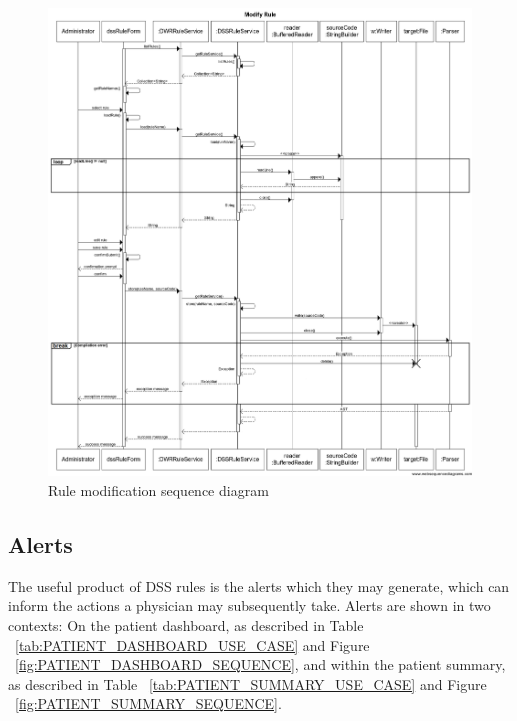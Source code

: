 \documentclass[12pt,letterpaper]{article}
\begin{document}
\begin{figure}\begin{center}
\includegraphics[width=6.5in]{sequence/modify_rule.png}
\end{center}
\caption{Rule modification sequence diagram} 
\label{fig:MODIFY_RULE_SEQUENCE}
\end{figure}

\subsection{Alerts}

The useful product of DSS rules is the alerts which they may generate, 
which can inform the actions a physician may subsequently take. Alerts 
are shown in two contexts: On the patient dashboard, as described in 
Table ~\ref{tab:PATIENT_DASHBOARD_USE_CASE} and 
Figure ~\ref{fig:PATIENT_DASHBOARD_SEQUENCE},
and within the patient summary, as described in 
Table ~\ref{tab:PATIENT_SUMMARY_USE_CASE} and 
Figure ~\ref{fig:PATIENT_SUMMARY_SEQUENCE}.
\end{document}
